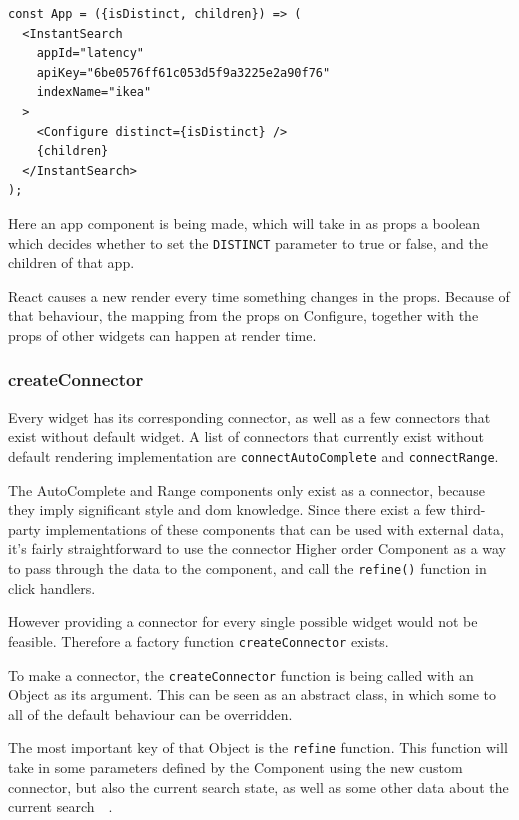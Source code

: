 \begin{minipage}{\linewidth}
\begin{lstlisting}[caption={Configure in an InstantSearch container},label={lst:ris-configure}]
const App = ({isDistinct, children}) => (
  <InstantSearch
    appId="latency"
    apiKey="6be0576ff61c053d5f9a3225e2a90f76"
    indexName="ikea"
  >
    <Configure distinct={isDistinct} />
    {children}
  </InstantSearch>
);
\end{lstlisting}
\end{minipage}

Here an app component is being made, which will take in as \gls{props} a boolean which decides whether to set the {\tt DISTINCT} parameter to true or false, and the children of that app.

React causes a new render every time something changes in the \gls{props}. Because of that behaviour, the mapping from the \gls{props} on Configure, together with the \gls{props} of other widgets can happen at render time.

\subsubsection{createConnector}
\label{ssub:ris-createconnector}

Every widget has its corresponding connector, as well as a few connectors that exist without default widget. A list of connectors that currently exist without default rendering implementation are {\tt connectAutoComplete} and {\tt connectRange}.

The AutoComplete and Range components only exist as a connector, because they imply significant style and \acrshort{dom} knowledge. Since there exist a few third-party implementations of these components that can be used with external data, it's fairly straightforward to use the connector Higher order Component as a way to pass through the data to the component, and call the {\tt refine()} function in click handlers. 

However providing a connector for every single possible widget would not be feasible. Therefore a factory function {\tt createConnector} exists.

To make a connector, the {\tt createConnector} function is being called with an Object as its argument. This can be seen as an abstract class, in which some to all of the default behaviour can be overridden. 

The most important key of that Object is the {\tt refine} function. This function will take in some parameters defined by the Component using the new custom connector, but also the current search state, as well as some other data about the current search~\cite{react-instantsearch-custom-connectors}~.

